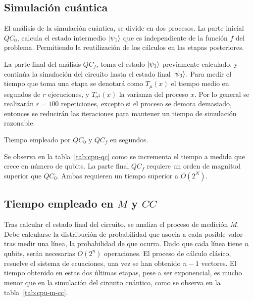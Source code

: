 \subsection{Simulación cuántica}
El análisis de la simulación cuántica, se divide en dos procesos. La parte 
inicial $QC_0$, calcula el estado intermedio $\ket{\psi_{1}}$ que es independiente de 
la función $f$ del problema. Permitiendo la reutilización de los cálculos en las 
etapas posteriores.

La parte final del análisis $QC_f$, toma el estado $\ket{\psi_{1}}$ previamente 
calculado, y continúa la simulación del circuito hasta el estado final $\ket{\psi_{3}}$. Para medir el tiempo que toma una etapa se denotará como $T_\mu(x)$ el 
tiempo medio en segundos de $r$ ejecuciones, y $T_{\sigma^2}(x)$ la varianza del 
proceso $x$. Por lo general se realizarán $r = 100$ repeticiones, excepto si el 
proceso se demora demasiado, entonces se reducirán las iteraciones para mantener 
un tiempo de simulación razonable.

\begin{table}[!htb]
\centering
{}
\caption{Tiempo empleado por $QC_0$ y $QC_f$ en segundos.}
\label{tab:cpu-qc}
\end{table}

Se observa en la tabla~\ref{tab:cpu-qc} como se incrementa el tiempo a medida 
que crece en número de qubits. La parte final $QC_f$ requiere un orden de 
magnitud superior que $QC_0$. Ambas requieren un tiempo superior a $O(2^N)$.

\subsection{Tiempo empleado en $M$ y $CC$}
Tras calcular el estado final del circuito, se analiza el proceso de medición 
$M$. Debe calcularse la distribución de probabilidad que asocia a cada posible 
valor tras medir una línea, la probabilidad de que ocurra. Dado que cada línea 
tiene $n$ qubits, serán necesarias $O(2^n)$ operaciones. El proceso de cálculo 
clásico, resuelve el sistema de ecuaciones, una vez se han obtenido $n-1$ 
vectores.
El tiempo obtenido en estas dos últimas etapas, pese a ser exponencial, es mucho 
menor que en la simulación del circuito cuántico, como se observa en la 
tabla~\ref{tab:cpu-m-cc}.


